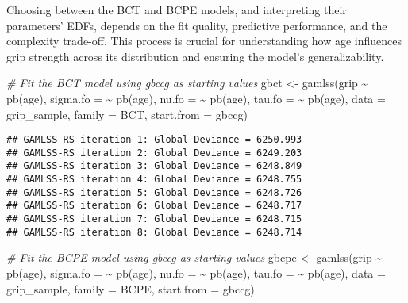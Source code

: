 \documentclass[
]{article}
\newenvironment{Shaded}{\begin{snugshade}}{\end{snugshade}}
\newcommand{\AttributeTok}[1]{\textcolor[rgb]{0.77,0.63,0.00}{#1}}
\newcommand{\CommentTok}[1]{\textcolor[rgb]{0.56,0.35,0.01}{\textit{#1}}}
\newcommand{\FunctionTok}[1]{\textcolor[rgb]{0.00,0.00,0.00}{#1}}
\newcommand{\NormalTok}[1]{#1}
\newcommand{\OtherTok}[1]{\textcolor[rgb]{0.56,0.35,0.01}{#1}}
\newcommand{\SpecialCharTok}[1]{\textcolor[rgb]{0.00,0.00,0.00}{#1}}
\begin{document}
Choosing between the BCT and BCPE models, and interpreting their
parameters' EDFs, depends on the fit quality, predictive performance,
and the complexity trade-off. This process is crucial for understanding
how age influences grip strength across its distribution and ensuring
the model's generalizability.

\begin{Shaded}
\begin{Highlighting}[]
\CommentTok{\# Fit the BCT model using gbccg as starting values}
\NormalTok{gbct }\OtherTok{\textless{}{-}} \FunctionTok{gamlss}\NormalTok{(grip }\SpecialCharTok{\textasciitilde{}} \FunctionTok{pb}\NormalTok{(age),}
               \AttributeTok{sigma.fo =} \SpecialCharTok{\textasciitilde{}} \FunctionTok{pb}\NormalTok{(age),}
               \AttributeTok{nu.fo =} \SpecialCharTok{\textasciitilde{}} \FunctionTok{pb}\NormalTok{(age),}
               \AttributeTok{tau.fo =} \SpecialCharTok{\textasciitilde{}} \FunctionTok{pb}\NormalTok{(age),}
               \AttributeTok{data =}\NormalTok{ grip\_sample,}
               \AttributeTok{family =}\NormalTok{ BCT,}
               \AttributeTok{start.from =}\NormalTok{ gbccg)}
\end{Highlighting}
\end{Shaded}

\begin{verbatim}
## GAMLSS-RS iteration 1: Global Deviance = 6250.993 
## GAMLSS-RS iteration 2: Global Deviance = 6249.203 
## GAMLSS-RS iteration 3: Global Deviance = 6248.849 
## GAMLSS-RS iteration 4: Global Deviance = 6248.755 
## GAMLSS-RS iteration 5: Global Deviance = 6248.726 
## GAMLSS-RS iteration 6: Global Deviance = 6248.717 
## GAMLSS-RS iteration 7: Global Deviance = 6248.715 
## GAMLSS-RS iteration 8: Global Deviance = 6248.714
\end{verbatim}

\begin{Shaded}
\begin{Highlighting}[]
\CommentTok{\# Fit the BCPE model using gbccg as starting values}
\NormalTok{gbcpe }\OtherTok{\textless{}{-}} \FunctionTok{gamlss}\NormalTok{(grip }\SpecialCharTok{\textasciitilde{}} \FunctionTok{pb}\NormalTok{(age),}
                \AttributeTok{sigma.fo =} \SpecialCharTok{\textasciitilde{}} \FunctionTok{pb}\NormalTok{(age),}
                \AttributeTok{nu.fo =} \SpecialCharTok{\textasciitilde{}} \FunctionTok{pb}\NormalTok{(age),}
                \AttributeTok{tau.fo =} \SpecialCharTok{\textasciitilde{}} \FunctionTok{pb}\NormalTok{(age),}
                \AttributeTok{data =}\NormalTok{ grip\_sample,}
                \AttributeTok{family =}\NormalTok{ BCPE,}
                \AttributeTok{start.from =}\NormalTok{ gbccg)}
\end{Highlighting}
\end{Shaded}
\end{document}
